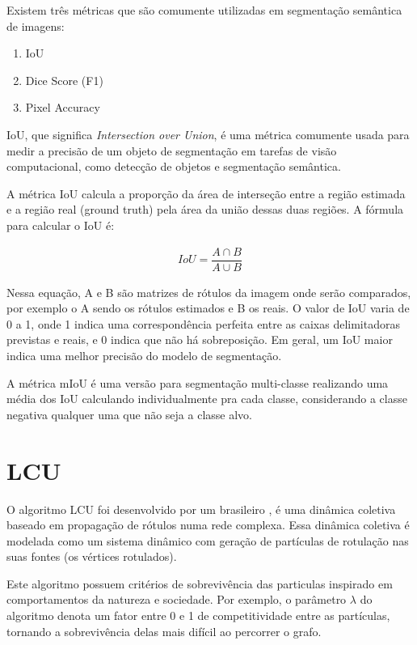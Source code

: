 Existem três métricas que são comumente utilizadas em segmentação
semântica de imagens:

\begin{enumerate}
\item IoU
\item Dice Score (F1)
\item Pixel Accuracy
\end{enumerate}

IoU, que significa \textit{Intersection over Union}, é uma métrica comumente
usada para medir a precisão de um objeto de segmentação em tarefas de
visão computacional, como detecção de objetos e segmentação semântica.

A métrica IoU calcula a proporção da área de interseção entre a região
estimada e a região real (ground truth) pela área da união dessas duas
regiões. A fórmula para calcular o IoU é:

\begin{gather}
  IoU = \dfrac{A \cap B}{A \cup B}
\end{gather}

Nessa equação, A e B são matrizes de rótulos da imagem onde serão
comparados, por exemplo o A sendo os rótulos estimados e B os reais. O
valor de IoU varia de 0 a 1, onde 1 indica uma correspondência
perfeita entre as caixas delimitadoras previstas e reais, e 0 indica
que não há sobreposição. Em geral, um IoU maior indica uma melhor
precisão do modelo de segmentação.

A métrica mIoU é uma versão para segmentação multi-classe realizando
uma média dos IoU calculando individualmente pra cada classe,
considerando a classe negativa qualquer uma que não seja a classe alvo.

\section{LCU}\label{sec:teorica-lcu}

O algoritmo \gls{LCU} foi desenvolvido por um brasileiro
\cite{VerriNetworkUnfoldingMap2018}, é uma dinâmica coletiva baseado
em propagação de rótulos numa rede complexa. Essa dinâmica coletiva é
modelada como um sistema dinâmico com geração de partículas de
rotulação nas suas fontes (os vértices rotulados).

Este algoritmo possuem critérios de sobrevivência das particulas
inspirado em comportamentos da natureza e sociedade. Por exemplo, o
parâmetro $ \lambda $ do algoritmo denota um fator entre 0 e 1 de
competitividade entre as partículas, tornando a sobrevivência delas
mais difícil ao percorrer o grafo.

